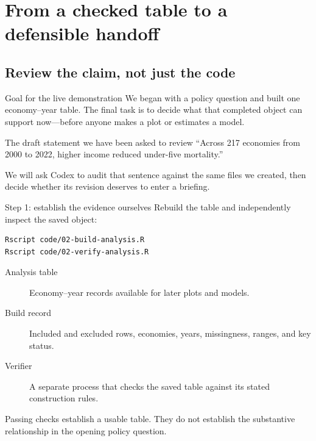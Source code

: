 \section{From a checked table to a defensible handoff}
\subsection{Review the claim, not just the code}

\begin{frame}{Goal for the live demonstration}
  We began with a policy question and built one economy--year table. The final
  task is to decide what that completed object can support \alert{now}---before
  anyone makes a plot or estimates a model.

  \vspace{0.6em}
  \begin{block}{The draft statement we have been asked to review}
    ``Across 217 economies from 2000 to 2022, higher income reduced under-five
    mortality.''
  \end{block}

  \vfill
  We will ask Codex to audit that sentence against the same files we created,
  then decide whether its revision deserves to enter a briefing.
\end{frame}

\begin{frame}[fragile]{Step 1: establish the evidence ourselves}
  Rebuild the table and independently inspect the saved object:

\begin{lstlisting}
Rscript code/02-build-analysis.R
Rscript code/02-verify-analysis.R
\end{lstlisting}

  \begin{description}
    \item[Analysis table] Economy--year records available for later plots and models.
    \item[Build record] Included and excluded rows, economies, years,
      missingness, ranges, and key status.
    \item[Verifier] A separate process that checks the saved table against its
      stated construction rules.
  \end{description}

  \vfill
  Passing checks establish a usable table. They do not establish the substantive
  relationship in the opening policy question.
\end{frame}

